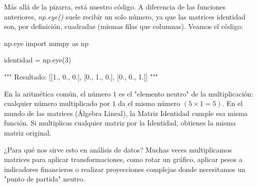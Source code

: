 Más allá de la pizarra, está nuestro código. A diferencia de las funciones anteriores, \textit{np.eye()} suele recibir un solo número, ya que las matrices identidad son, por definición, cuadradas (mismas filas que columnas). Veamos el código:

\begin{pycode}{np.eye}
import numpy as np

identidad = np.eye(3)

"""
Resultado:
[[1., 0., 0.],
[0., 1., 0.],
[0., 0., 1.]]
"""
\end{pycode}

En la aritmética común, el número \(1\) es el "elemento neutro" de la multiplicación: cualquier número multiplicado por \(1\) da el mismo número \((5\times1=5)\).
En el mundo de las matrices (Álgebra Lineal), la Matriz Identidad cumple esa misma función. Si multiplicas cualquier matriz por la Identidad, obtienes la misma matriz original.

¿Para qué nos sirve esto en análisis de datos? Muchas veces multiplicamos matrices para aplicar transformaciones, como rotar un gráfico, aplicar pesos a indicadores financieros o realizar proyecciones complejas donde necesitamos un "punto de partida" neutro.

